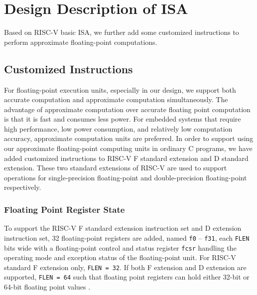 \section{Design Description of ISA} %

Based on RISC-V basic ISA, we further add some customized instructions to perform approximate floating-point computations.

\subsection{Customized Instructions} \label{section：Customized Instructions} %
For floating-point execution units, especially in our design, we support both accurate computation and approximate computation simultaneously. The advantage of approximate computation over accurate floating point computation is that it is fast and consumes less power. For embedded systems that require high performance, low power consumption, and relatively low computation accuracy, approximate computation units are preferred. In order to support using our approximate floating-point computing units in ordinary C programs, we have added customized instructions to RISC-V F standard extension and D standard extension. These two standard extensions of RISC-V are used to support operations for single-precision floating-point and double-precision floating-point respectively.

\subsubsection{Floating Point Register State}

To support the RISC-V F standard extension instruction set and D extension instruction set, 32 floating-point registers are added, named \texttt{f0} – \texttt{f31}, each \texttt{FLEN} bits wide with a floating-point control and status register \texttt{fcsr} handling the operating mode and exception status of the floating-point unit. For RISC-V standard F extension only,  \texttt{FLEN = 32}. If both F extension and D extension are supported, \texttt{FLEN = 64} such that floating point registers can hold either 32-bit or 64-bit floating point values . 


